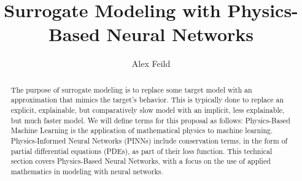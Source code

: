 \documentclass[]{article}
\title{Surrogate Modeling with Physics-Based Neural Networks}
\author{Alex Feild}
\begin{document}
\maketitle

\begin{abstract}
The purpose of surrogate modeling is to replace some target model with an approximation that mimics the target's behavior.  This is typically done to replace an explicit, explainable, but comparatively slow model with an implicit, less explainable, but much faster model.  We will define terms for this proposal as follows:  Physics-Based Machine Learning is the application of mathematical physics to machine learning.  Physics-Informed Neural Networks (PINNs) include conservation terms, in the form of partial differential equations (PDEs), as part of their loss function.  This technical section covers Physics-Based Neural Networks, with a focus on the use of applied mathematics in modeling with neural networks.  

\end{abstract}
\end{document}
